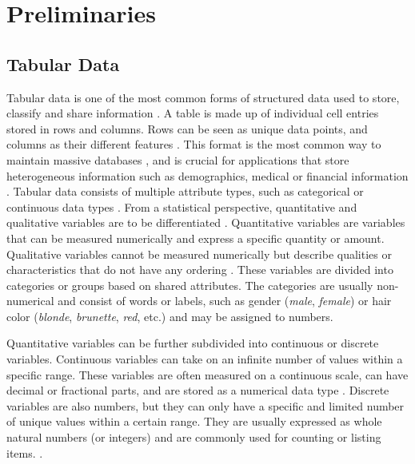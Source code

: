 \chapter{Preliminaries}
\label{ch:preliminaries}

\section{Tabular Data}
\label{ch:preliminaries-dataSynthesis-tabularData}

Tabular data is one of the most common forms of structured data \cite{hernandez2022SyntheticDataGeneration} used to store, classify and share information \cite{pilaluisa2022ContextualWordEmbeddings}.
A table is made up of individual cell entries stored in rows and columns.
Rows can be seen as unique data points, and columns as their different features \cite{borisov2022DeepNeuralNetworks, yoon2020VIMEExtendingSuccess}.
This format is the most common way to maintain massive databases \cite{esmaeilpour2022BidiscriminatorGANTabular, yoon2020VIMEExtendingSuccess}, and is crucial for applications that store heterogeneous information such as demographics, medical or financial information \cite{borisov2022DeepNeuralNetworks, yoon2020VIMEExtendingSuccess}.
Tabular data consists of multiple attribute types, such as categorical or continuous data types \cite{borisov2022DeepNeuralNetworks}.
From a statistical perspective, quantitative and qualitative variables are to be differentiated \cite{lane2003IntroductionStatistics}.
Quantitative variables are variables that can be measured numerically and express a specific quantity or amount. 
Qualitative variables cannot be measured numerically but describe qualities or characteristics that do not have any ordering \cite{lane2003IntroductionStatistics}. 
These variables are divided into categories or groups based on shared attributes. 
The categories are usually non-numerical and consist of words or labels, such as gender (\textit{male}, \textit{female}) or hair color (\textit{blonde}, \textit{brunette}, \textit{red}, etc.) and may be assigned to numbers.

Quantitative variables can be further subdivided into continuous or discrete variables.
Continuous variables can take on an infinite number of values within a specific range. 
These variables are often measured on a continuous scale, can have decimal or fractional parts, and are stored as a numerical data type \cite{lane2003IntroductionStatistics, lederrey2022DATGANIntegratingExperta}.
Discrete variables are also numbers, but they can only have a specific and limited number of unique values within a certain range. 
They are usually expressed as whole natural numbers (or integers) and are commonly used for counting or listing items. \cite{lane2003IntroductionStatistics}.

